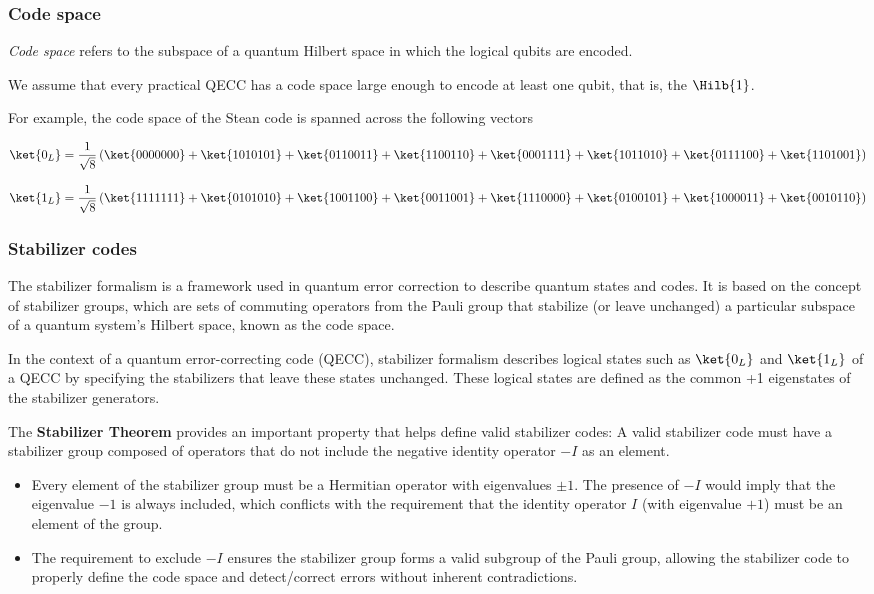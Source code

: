 \subsubsection*{Code space}

\textit{Code space} refers to the subspace of a quantum Hilbert space in which the logical qubits
are encoded.

We assume that every practical QECC has a code space large enough to encode at least one qubit, that
is, the $\Hilb{1}$.

\vsp

For example, the code space of the Stean code is spanned across the following vectors

\[
\ket{0_L} = \frac{1}{\sqrt{8}} \left( \ket{0000000} + \ket{1010101} + \ket{0110011} + \ket{1100110}
+ \ket{0001111} + \ket{1011010} + \ket{0111100} + \ket{1101001} \right)
\]

\vsp

\[
\ket{1_L} = \frac{1}{\sqrt{8}} \left( \ket{1111111} + \ket{0101010} + \ket{1001100} + \ket{0011001}
+ \ket{1110000} + \ket{0100101} + \ket{1000011} + \ket{0010110} \right)
\]


\subsubsection*{Stabilizer codes}

The stabilizer formalism is a framework used in quantum error correction to describe quantum states
and codes. It is based on the concept of stabilizer groups, which are sets of commuting operators
from the Pauli group that stabilize (or leave unchanged) a particular subspace of a quantum system's
Hilbert space, known as the code space.

\vsp

In the context of a quantum error-correcting code (QECC), stabilizer formalism describes logical
states such as \(\ket{0_L}\) and \(\ket{1_L}\) of a QECC by specifying the stabilizers that leave
these states unchanged.  These logical states are defined as the common +1 eigenstates of the
stabilizer generators.

\vsp

The \textbf{Stabilizer Theorem} provides an important property that helps define valid stabilizer
codes: A valid stabilizer code must have a stabilizer group composed of operators that do not
include the negative identity operator \(-I\) as an element.

\begin{itemize}
  \item Every element of the stabilizer group must be a Hermitian operator with eigenvalues \( \pm 1
\). The presence of \(-I\) would imply that the eigenvalue \(-1\) is always included, which
conflicts with the requirement that the identity operator \(I\) (with eigenvalue \(+1\)) must be an
element of the group.
  \item The requirement to exclude \(-I\) ensures the stabilizer group forms a valid subgroup of the
Pauli group, allowing the stabilizer code to properly define the code space and detect/correct
errors without inherent contradictions.
\end{itemize}


